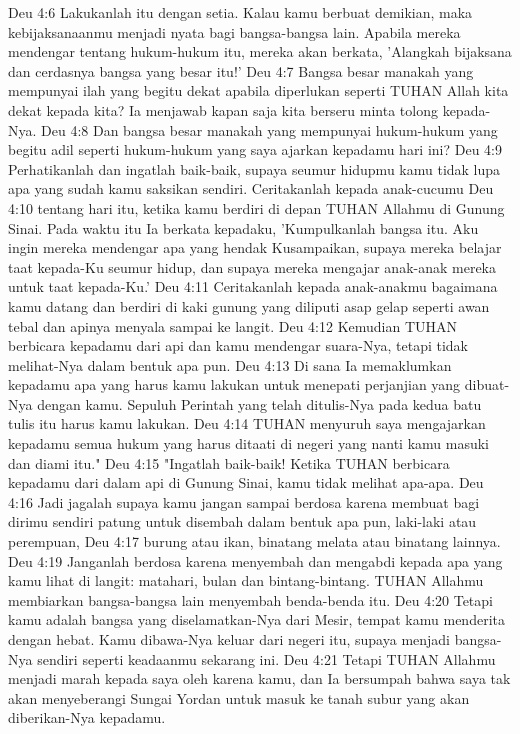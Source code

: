 Deu 4:6  Lakukanlah itu dengan setia. Kalau kamu berbuat demikian, maka kebijaksanaanmu menjadi nyata bagi bangsa-bangsa lain. Apabila mereka mendengar tentang hukum-hukum itu, mereka akan berkata, 'Alangkah bijaksana dan cerdasnya bangsa yang besar itu!'
Deu 4:7  Bangsa besar manakah yang mempunyai ilah yang begitu dekat apabila diperlukan seperti TUHAN Allah kita dekat kepada kita? Ia menjawab kapan saja kita berseru minta tolong kepada-Nya.
Deu 4:8  Dan bangsa besar manakah yang mempunyai hukum-hukum yang begitu adil seperti hukum-hukum yang saya ajarkan kepadamu hari ini?
Deu 4:9  Perhatikanlah dan ingatlah baik-baik, supaya seumur hidupmu kamu tidak lupa apa yang sudah kamu saksikan sendiri. Ceritakanlah kepada anak-cucumu
Deu 4:10  tentang hari itu, ketika kamu berdiri di depan TUHAN Allahmu di Gunung Sinai. Pada waktu itu Ia berkata kepadaku, 'Kumpulkanlah bangsa itu. Aku ingin mereka mendengar apa yang hendak Kusampaikan, supaya mereka belajar taat kepada-Ku seumur hidup, dan supaya mereka mengajar anak-anak mereka untuk taat kepada-Ku.'
Deu 4:11  Ceritakanlah kepada anak-anakmu bagaimana kamu datang dan berdiri di kaki gunung yang diliputi asap gelap seperti awan tebal dan apinya menyala sampai ke langit.
Deu 4:12  Kemudian TUHAN berbicara kepadamu dari api dan kamu mendengar suara-Nya, tetapi tidak melihat-Nya dalam bentuk apa pun.
Deu 4:13  Di sana Ia memaklumkan kepadamu apa yang harus kamu lakukan untuk menepati perjanjian yang dibuat-Nya dengan kamu. Sepuluh Perintah yang telah ditulis-Nya pada kedua batu tulis itu harus kamu lakukan.
Deu 4:14  TUHAN menyuruh saya mengajarkan kepadamu semua hukum yang harus ditaati di negeri yang nanti kamu masuki dan diami itu."
Deu 4:15  "Ingatlah baik-baik! Ketika TUHAN berbicara kepadamu dari dalam api di Gunung Sinai, kamu tidak melihat apa-apa.
Deu 4:16  Jadi jagalah supaya kamu jangan sampai berdosa karena membuat bagi dirimu sendiri patung untuk disembah dalam bentuk apa pun, laki-laki atau perempuan,
Deu 4:17  burung atau ikan, binatang melata atau binatang lainnya.
Deu 4:19  Janganlah berdosa karena menyembah dan mengabdi kepada apa yang kamu lihat di langit: matahari, bulan dan bintang-bintang. TUHAN Allahmu membiarkan bangsa-bangsa lain menyembah benda-benda itu.
Deu 4:20  Tetapi kamu adalah bangsa yang diselamatkan-Nya dari Mesir, tempat kamu menderita dengan hebat. Kamu dibawa-Nya keluar dari negeri itu, supaya menjadi bangsa-Nya sendiri seperti keadaanmu sekarang ini.
Deu 4:21  Tetapi TUHAN Allahmu menjadi marah kepada saya oleh karena kamu, dan Ia bersumpah bahwa saya tak akan menyeberangi Sungai Yordan untuk masuk ke tanah subur yang akan diberikan-Nya kepadamu.

